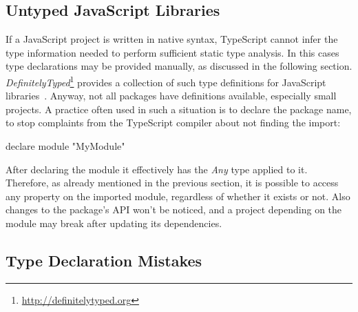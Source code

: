 \subsection{Untyped JavaScript Libraries}

If a JavaScript project is written in native syntax, TypeScript cannot infer the type information needed to perform sufficient static type analysis. In this cases type declarations may be provided manually, as discussed in the following section. \emph{DefinitelyTyped}\footnote{\url{http://definitelytyped.org}} provides a collection of such type definitions for JavaScript libraries~\cite{DefinitelyTyped}. Anyway, not all packages have definitions available, especially small projects. A practice often used in such a situation is to declare the package name, to stop complaints from the TypeScript compiler about not finding the import:
\begin{JsCode}[numbers=none]
declare module "MyModule"
\end{JsCode}
After declaring the module it effectively has the \emph{Any} type applied to it. Therefore, as already mentioned in the previous section, it is possible to access any property on the imported module, regardless of whether it exists or not. Also changes to the package's API won't be noticed, and a project depending on the module may break after updating its dependencies.

\subsection{Type Declaration Mistakes}

